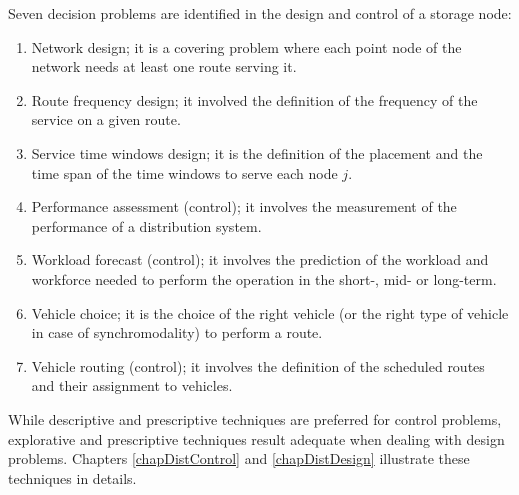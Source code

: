 Seven decision problems are identified in the design and control of a storage node:

\begin{enumerate}
    \item Network design; it is a covering problem where each point node of the network needs at least one route serving it.
	\item Route frequency design; it involved the definition of the frequency of the service on a given route.
	\item Service time windows design; it is the definition of the placement and the time span of the time windows to serve each node $j$.
	\item Performance assessment (control); it involves the measurement of the performance of a distribution system.
	\item Workload forecast (control); it involves the prediction of the workload and workforce needed to perform the operation in the short-, mid- or long-term.
	\item Vehicle choice; it is the choice of the right vehicle (or the right type of vehicle in case of synchromodality) to perform a route.
	\item Vehicle routing (control); it involves the definition of the scheduled routes and their assignment to vehicles.

\end{enumerate}

While descriptive and prescriptive techniques are preferred for control problems, explorative and prescriptive techniques result adequate when dealing with design problems. Chapters \ref{chapDistControl} and \ref{chapDistDesign} illustrate these techniques in details.







